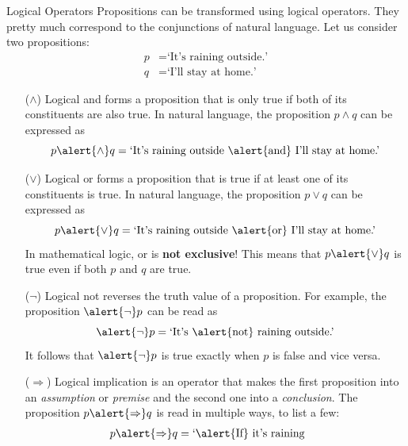 \documentclass[final]{beamer}
\newlength{\colwidth}
\begin{document}
\begin{frame}[t]
\begin{columns}[t]
\begin{column}{\colwidth}
      \begin{exampleblock}{Logical Operators}
        Propositions can be transformed using \alert{logical
        operators}. They pretty
        much correspond to the conjunctions of natural language. Let
        us consider two
        propositions:
        \begin{align*}
          p &= \text{`It's raining outside.'}\\
          q &= \text{`I'll stay at home.'}
        \end{align*}
        \begin{itemize}[left=40pt]
          \item[($ \wedge $)] Logical \alert{and} forms a proposition that is
            only \alert{true} if both of its constituents are also \alert{true}.
            In natural language, the proposition $p \wedge q$ can be expressed
            as
            \[
              p \alert{ \wedge } q = \text{`It's raining outside
                \alert{and} I'll stay at
              home.'}
            \]
          \item[($ \vee $)] Logical \alert{or} forms a proposition
            that is \alert{true}
            if at least one of its constituents is \alert{true}. In natural
            language, the proposition $p \vee q$ can be expressed as
            \[
              p \alert{ \vee } q = \text{`It's raining outside
                \alert{or} I'll stay at
              home.'}
            \]
            In mathematical logic, \alert{or} is \textbf{not
            exclusive}! This means that
            $p \alert{ \vee } q$ is true even if both $p$ and $q$ are true.
          \item[($\neg $)] Logical \alert{not} reverses the truth value of a
            proposition. For example, the proposition $\alert{\neg }p$ can be
            read as
            \[
              \alert{\neg }p = \text{`It's \alert{not} raining outside.'}
            \]
            It follows that $\alert{\neg }p$ is \alert{true} exactly when $p$ is
            \alert{false} and vice versa.
          \item[($ \Rightarrow $)] Logical \alert{implication} is an operator
            that makes the first proposition into an \emph{assumption} or
            \emph{premise} and the second one into a \emph{conclusion}. The
            proposition $p \alert{ \Rightarrow } q$ is read in multiple ways, to
            list a few:
            \begin{align*}
              p \alert{ \Rightarrow } q &= \text{`\alert{If} it's raining
}
\end{align*}
\end{itemize}
\end{exampleblock}
\end{column}
\end{columns}
\end{frame}
\end{document}
